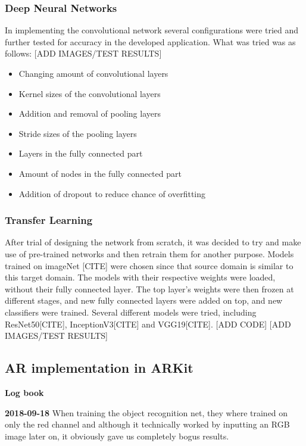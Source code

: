 \subsubsection{Deep Neural Networks}
In implementing the convolutional network several configurations were tried and further tested for accuracy in the developed application. What was tried was as follows:
[ADD IMAGES/TEST RESULTS]

\begin{itemize}
\item Changing amount of convolutional layers
\item Kernel sizes of the convolutional layers
\item Addition and removal of pooling layers
\item Stride sizes of the pooling layers
\item Layers in the fully connected part
\item Amount of nodes in the fully connected part
\item Addition of dropout to reduce chance of overfitting 
\end{itemize}

\subsubsection{Transfer Learning}
After trial of designing the network from scratch, it was decided to try and make use of pre-trained networks and then retrain them for another purpose. Models trained on imageNet [CITE] were chosen since that source domain is similar to this target domain. The models with their respective weights were loaded, without their fully connected layer. The top layer's weights were then frozen at different stages, and new fully connected layers were added on top, and new classifiers were trained. 
Several different models were tried, including ResNet50[CITE], InceptionV3[CITE] and VGG19[CITE].
[ADD CODE]
[ADD IMAGES/TEST RESULTS]
\subsection{AR implementation in ARKit}

\newpage

\begin{center}
\textbf{Log book}
\end{center}

\textbf{2018-09-18}
When training the object recognition net, they where trained on only the red channel and although it technically worked by inputting an RGB image later on, it obviously gave us completely bogus results.